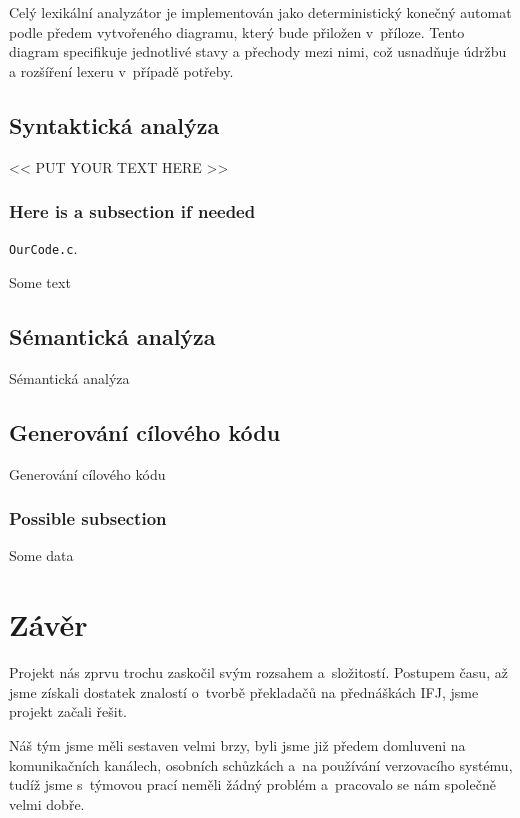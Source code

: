 \documentclass[a4paper, 11pt]{article}
\begin{document}
    Celý lexikální analyzátor je implementován jako deterministický konečný automat podle předem vytvořeného diagramu, který bude přiložen v~příloze. Tento diagram specifikuje jednotlivé stavy a přechody mezi nimi, což usnadňuje údržbu a rozšíření lexeru v~případě potřeby.  

	\subsection{Syntaktická analýza}

	<< PUT YOUR TEXT HERE >>

	\subsubsection{Here is a subsection if needed}

	\texttt{OurCode.c}.

	Some text


	\subsection{Sémantická analýza}

	Sémantická analýza


	\subsection{Generování cílového kódu}

	Generování cílového kódu

	\subsubsection{Possible subsection}

    Some data


	


	\section{Závěr}

	Projekt nás zprvu trochu zaskočil svým rozsahem a~složitostí. Postupem času, až jsme získali dostatek
	znalostí o~tvorbě překladačů na přednáškách IFJ, jsme projekt začali řešit.

	Náš tým jsme měli sestaven velmi brzy, byli jsme již předem domluveni na komunikačních kanálech,
	osobních schůzkách a~na používání verzovacího systému, tudíž jsme s~týmovou prací neměli žádný
	problém a~pracovalo se nám společně velmi dobře.
\end{document}
